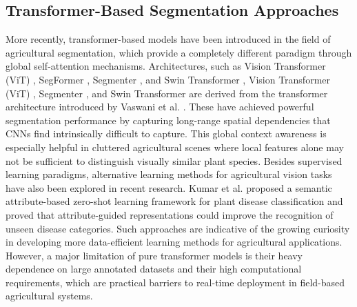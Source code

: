 \documentclass[pdflatex,sn-mathphys-num]{sn-jnl}
\begin{document}
\subsection{Transformer-Based Segmentation Approaches}
More recently, transformer-based models have been introduced in the field of agricultural segmentation, which provide a completely different paradigm through global self-attention mechanisms.
Architectures, such as Vision Transformer (ViT) \cite{dosovitskiy2021vit}, SegFormer \cite{xie2021segformer}, Segmenter \cite{strudel2021segmenter}, and Swin Transformer \cite{liu2021swin}, Vision Transformer (ViT) \cite{dosovitskiy2021vit},
Segmenter \cite{strudel2021segmenter},
and Swin Transformer \cite{liu2021swin}
are derived from the transformer architecture introduced by Vaswani et al. \cite{vaswani2017attention}. These have achieved powerful segmentation performance by capturing long-range spatial dependencies that CNNs find intrinsically difficult to capture. This global context awareness is especially helpful in cluttered agricultural scenes where local features alone may not be sufficient to distinguish visually similar plant species. Besides supervised learning paradigms, alternative learning methods for agricultural vision tasks have also been explored in recent research. Kumar et al. \cite{kumar2024zeroshot} proposed a semantic attribute-based zero-shot learning framework for plant disease classification and proved that attribute-guided representations could improve the recognition of unseen disease categories. Such approaches are indicative of the growing curiosity in developing more data-efficient learning methods for agricultural applications. However, a major limitation of pure transformer models is their heavy dependence on large annotated datasets and their high computational requirements, which are practical barriers to real-time deployment in field-based agricultural systems.
\end{document}
